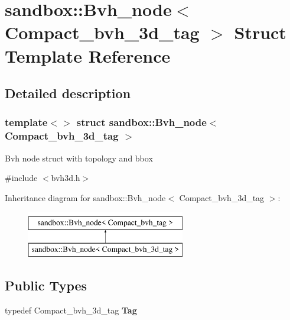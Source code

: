 \hypertarget{structsandbox_1_1_bvh__node_3_01_compact__bvh__3d__tag_01_4}{}\section{sandbox\+:\+:Bvh\+\_\+node$<$ Compact\+\_\+bvh\+\_\+3d\+\_\+tag $>$ Struct Template Reference}
\label{structsandbox_1_1_bvh__node_3_01_compact__bvh__3d__tag_01_4}


\subsection{Detailed description}
\subsubsection*{template$<$$>$\newline
struct sandbox\+::\+Bvh\+\_\+node$<$ Compact\+\_\+bvh\+\_\+3d\+\_\+tag $>$}

Bvh node struct with topology and bbox 

{\ttfamily \#include $<$bvh3d.\+h$>$}

Inheritance diagram for sandbox\+:\+:Bvh\+\_\+node$<$ Compact\+\_\+bvh\+\_\+3d\+\_\+tag $>$\+:\begin{figure}[H]
\begin{center}
\leavevmode
\includegraphics[height=2.000000cm]{structsandbox_1_1_bvh__node_3_01_compact__bvh__3d__tag_01_4}
\end{center}
\end{figure}
\subsection*{Public Types}
\begin{DoxyCompactItemize}
\item 
\mbox{\label{structsandbox_1_1_bvh__node_3_01_compact__bvh__3d__tag_01_4_afadcaf787c49bbd52eff47e5480cd441}} 
typedef Compact\+\_\+bvh\+\_\+3d\+\_\+tag {\bfseries Tag}
\end{DoxyCompactItemize}

